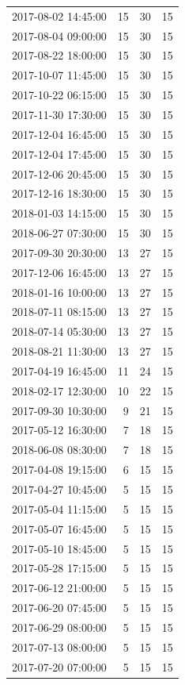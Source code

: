 \begin{tabular}{lrrr}
2017-08-02 14:45:00 & 15 & 30 & 15 \\
2017-08-04 09:00:00 & 15 & 30 & 15 \\
2017-08-22 18:00:00 & 15 & 30 & 15 \\
2017-10-07 11:45:00 & 15 & 30 & 15 \\
2017-10-22 06:15:00 & 15 & 30 & 15 \\
2017-11-30 17:30:00 & 15 & 30 & 15 \\
2017-12-04 16:45:00 & 15 & 30 & 15 \\
2017-12-04 17:45:00 & 15 & 30 & 15 \\
2017-12-06 20:45:00 & 15 & 30 & 15 \\
2017-12-16 18:30:00 & 15 & 30 & 15 \\
2018-01-03 14:15:00 & 15 & 30 & 15 \\
2018-06-27 07:30:00 & 15 & 30 & 15 \\
2017-09-30 20:30:00 & 13 & 27 & 15 \\
2017-12-06 16:45:00 & 13 & 27 & 15 \\
2018-01-16 10:00:00 & 13 & 27 & 15 \\
2018-07-11 08:15:00 & 13 & 27 & 15 \\
2018-07-14 05:30:00 & 13 & 27 & 15 \\
2018-08-21 11:30:00 & 13 & 27 & 15 \\
2017-04-19 16:45:00 & 11 & 24 & 15 \\
2018-02-17 12:30:00 & 10 & 22 & 15 \\
2017-09-30 10:30:00 & 9 & 21 & 15 \\
2017-05-12 16:30:00 & 7 & 18 & 15 \\
2018-06-08 08:30:00 & 7 & 18 & 15 \\
2017-04-08 19:15:00 & 6 & 15 & 15 \\
2017-04-27 10:45:00 & 5 & 15 & 15 \\
2017-05-04 11:15:00 & 5 & 15 & 15 \\
2017-05-07 16:45:00 & 5 & 15 & 15 \\
2017-05-10 18:45:00 & 5 & 15 & 15 \\
2017-05-28 17:15:00 & 5 & 15 & 15 \\
2017-06-12 21:00:00 & 5 & 15 & 15 \\
2017-06-20 07:45:00 & 5 & 15 & 15 \\
2017-06-29 08:00:00 & 5 & 15 & 15 \\
2017-07-13 08:00:00 & 5 & 15 & 15 \\
2017-07-20 07:00:00 & 5 & 15 & 15 \\

\end{tabular}
